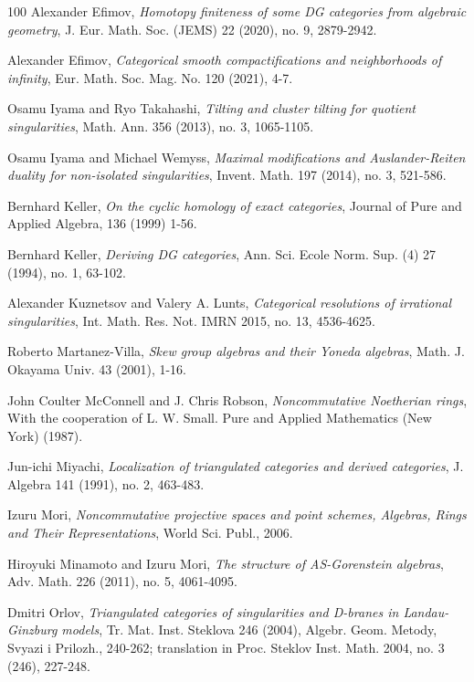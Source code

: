 \documentclass[11pt,reqno]{amsart}
\theoremstyle{definition}
\begin{document}
\begin{thebibliography}{100}
Alexander Efimov,
{\it Homotopy finiteness of some DG categories from algebraic geometry},  
J. Eur. Math. Soc. (JEMS) 22 (2020), no. 9, 2879-2942. 


Alexander Efimov, 
{\it Categorical smooth compactifications and neighborhoods of infinity}, 
Eur. Math. Soc. Mag. No. 120 (2021), 4-7.





Osamu Iyama and Ryo Takahashi,
{\it Tilting and cluster tilting for quotient singularities},
Math. Ann. 356 (2013), no. 3, 1065-1105.

Osamu Iyama and Michael Wemyss, 
{\it Maximal modifications and Auslander-Reiten duality for non-isolated singularities},  
Invent. Math. 197 (2014), no. 3, 521-586. 




Bernhard Keller,
{\it  On the cyclic homology of exact categories},
Journal of Pure and Applied Algebra, 136 (1999) 1-56.


Bernhard Keller,
{\it Deriving DG categories},
Ann. Sci. Ecole Norm. Sup. (4) 27 (1994), no. 1, 63-102.


Alexander Kuznetsov and Valery A. Lunts, 
{\it Categorical resolutions of irrational singularities},
Int. Math. Res. Not. IMRN 2015, no. 13, 4536-4625.


Roberto Martanez-Villa,
{\it Skew group algebras and their Yoneda algebras},
Math. J. Okayama Univ. 43 (2001), 1-16.


John Coulter McConnell and J. Chris Robson, 
{\it Noncommutative Noetherian rings},  With the cooperation of L. W. Small. Pure and Applied Mathematics (New York) (1987). 


Jun-ichi Miyachi, 
{\it Localization of triangulated categories and derived categories},  
J. Algebra 141 (1991), no. 2, 463-483.

Izuru Mori,
{\it Noncommutative projective spaces and point schemes, Algebras, Rings and Their Representations}, World Sci. Publ., 2006.

Hiroyuki Minamoto and Izuru Mori,
{\it The structure of AS-Gorenstein algebras},
Adv. Math. 226 (2011), no. 5, 4061-4095.


Dmitri Orlov,
{\it Triangulated categories of singularities and D-branes in Landau-Ginzburg models},
Tr. Mat. Inst. Steklova 246 (2004), Algebr. Geom. Metody, Svyazi i Prilozh.,
240-262; translation in
Proc. Steklov Inst. Math. 2004, no. 3 (246), 227-248.


\end{thebibliography}
\end{document}
